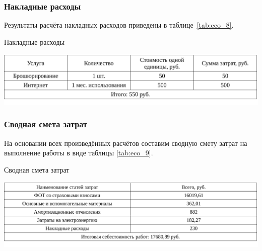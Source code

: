 \subsubsection{Накладные расходы}

Результаты расчёта накладных расходов приведены в таблице~\ref{tab:eco_8}.

\begin{table}[ht!]
\caption{Накладные расходы}
\centering
\includegraphics[page=1, width=1\linewidth]{tables/economics/econom_3.pdf}
\label{tab:eco_8}
\end{table}


\subsubsection{Сводная смета затрат}

На основании всех произведённых расчётов составим сводную смету затрат на выполнение работы в виде таблицы \ref{tab:eco_9}.

\begin{table}[ht!]
\caption{Сводная смета затрат}
\centering
\includegraphics[page=1, width=1\linewidth]{tables/economics/econom_4.pdf}
\label{tab:eco_9}
\end{table}


% 
% 
% 
% 
% 

% 
% 